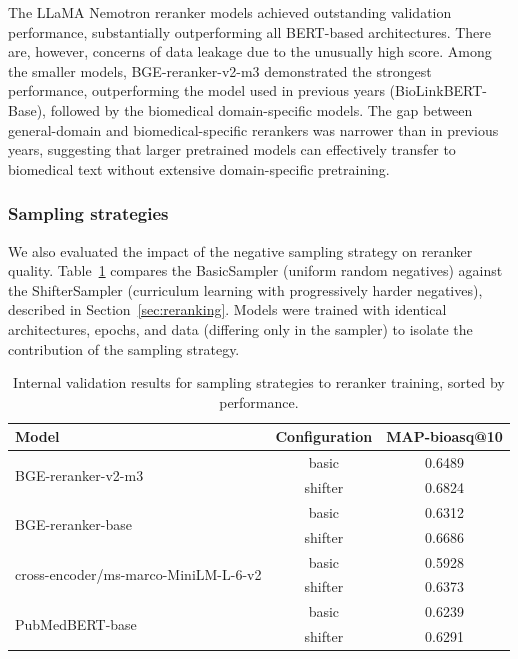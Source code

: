 The LLaMA Nemotron reranker models achieved outstanding validation performance, substantially outperforming all BERT-based architectures. There are, however, concerns of data leakage due to the unusually high score. Among the smaller models, BGE-reranker-v2-m3 demonstrated the strongest performance, outperforming the model used in previous years (BioLinkBERT-Base), followed by the biomedical domain-specific models. The gap between general-domain and biomedical-specific rerankers was narrower than in previous years, suggesting that larger pretrained models can effectively transfer to biomedical text without extensive domain-specific pretraining.

\subsubsection{Sampling strategies}

We also evaluated the impact of the negative sampling strategy on reranker quality. Table~\ref{tab:reranker-sampling-val} compares the BasicSampler (uniform random negatives) against the ShifterSampler (curriculum learning with progressively harder negatives), described in Section~\ref{sec:reranking}. Models were trained with identical architectures, epochs, and data (differing only in the sampler) to isolate the contribution of the sampling strategy.

\begin{table}[ht]
  \centering
  \caption{Internal validation results for sampling strategies to reranker training, sorted by performance.}
  \label{tab:reranker-sampling-val}
  \footnotesize
  \begin{tabular}{lcc}
    \toprule
    \textbf{Model} & \textbf{Configuration} & \textbf{MAP-bioasq@10} \\
    \midrule
    \multirow{2}{*}{BGE-reranker-v2-m3}
    & basic & 0.6489 \\
    & shifter & 0.6824 \\
    \midrule
    \multirow{2}{*}{BGE-reranker-base}
    & basic & 0.6312 \\
    & shifter & 0.6686 \\
    \midrule
    \multirow{2}{*}{cross-encoder/ms-marco-MiniLM-L-6-v2}
    & basic & 0.5928 \\
    & shifter & 0.6373 \\
    \midrule
    \multirow{2}{*}{PubMedBERT-base}
    & basic & 0.6239 \\
    & shifter & 0.6291 \\
    \bottomrule
  \end{tabular}
\end{table}

